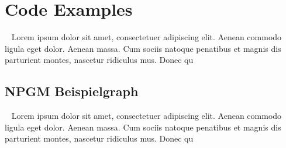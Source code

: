 \graphicspath{{appendix01/bilder/}}


\chapter{Code Examples}\label{chap:codebiespiele}
~
Lorem ipsum dolor sit amet, consectetuer adipiscing elit. Aenean commodo ligula eget dolor. Aenean massa. Cum sociis natoque penatibus et magnis dis parturient montes, nascetur ridiculus mus. Donec qu

\section{NPGM Beispielgraph}\label{chap:codebiespiele_sec:beispielgraph}
~
Lorem ipsum dolor sit amet, consectetuer adipiscing elit. Aenean commodo ligula eget dolor. Aenean massa. Cum sociis natoque penatibus et magnis dis parturient montes, nascetur ridiculus mus. Donec qu
